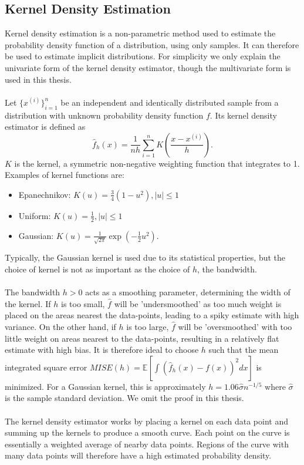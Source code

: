\documentclass[a4paper,12pt]{article}
\newcommand{\E}{\mathbb{E}}
\numberwithin{equation}{section}
\begin{document}
\subsection{Kernel Density Estimation}
Kernel density estimation is a non-parametric method used to estimate the probability density function of a distribution, using only samples. It can therefore be used to estimate implicit distributions. For simplicity we only explain the univariate form of the kernel density estimator, though the multivariate form is used in this thesis.\\
\\
Let $\{x^{(i)}\}^n_{i=1}$ be an independent and identically distributed sample from a distribution with unknown probability density function $f$. Its kernel density estimator is defined as
\[\hat{f}_h(x)=\frac{1}{nh}\sum^n_{i=1}K\left(\frac{x-x^{(i)}}{h}\right).\]
$K$ is the kernel, a symmetric non-negative weighting function that integrates to 1. Examples of kernel functions are:
\begin{itemize}
\item Epanechnikov: $K(u)=\frac{3}{4}(1-u^2), |u|\leq 1$
\item Uniform: $K(u)=\frac12, |u|\leq 1$
\item Gaussian: $K(u)=\frac{1}{\sqrt{2\pi}}\exp\left(-\frac{1}{2}u^2\right)$.
\end{itemize}
Typically, the Gaussian kernel is used due to its statistical properties, but the choice of kernel is not as important as the choice of $h$, the bandwidth.\\
\\
The bandwidth $h>0$ acts as a smoothing parameter, determining the width of the kernel. If $h$ is too small, $\hat{f}$ will be 'undersmoothed' as too much weight is placed on the areas nearest the data-points, leading to a spiky estimate with high variance. On the other hand, if $h$ is too large, $\hat{f}$ will be 'oversmoothed' with too little weight on areas nearest to the data-points, resulting in a relatively flat estimate with high bias. It is therefore ideal to choose $h$ such that the mean integrated square error $MISE(h)=\E\left[\int(\hat{f}_h(x)-f(x))^2dx\right]$ is minimized. For a Gaussian kernel, this is approximately $h=1.06\hat{\sigma}n^{-1/5}$ where $\hat{\sigma}$ is the sample standard deviation. We omit the proof in this thesis.\\
\\
The kernel density estimator works by placing a kernel on each data point and summing up the kernels to produce a smooth curve. Each point on the curve is essentially a weighted average of nearby data points. Regions of the curve with many data points will therefore have a high estimated probability density.
\newpage
\end{document}
